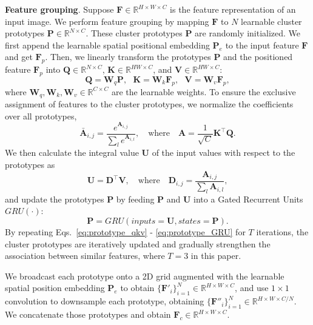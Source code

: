 \noindent\textbf{Feature grouping}. 
Suppose $\mathbf{F}\in \mathbb{R}^{H\times W\times C}$ is the feature representation of an input image. We perform feature grouping by mapping $\mathbf{F}$ to $N$ learnable cluster prototypes $\mathbf{P}\in \mathbb{R}^{N\times C}$. These cluster prototypes $\mathbf{P}$ are randomly initialized. 
We first append the learnable spatial positional embedding $\mathbf{P}_e$ to the input feature $\mathbf{F}$ and get $\mathbf{F}_p$. Then, we linearly transform the prototypes $\mathbf{P}$ and the positioned feature $\mathbf{F}_p$ into $\mathbf{Q}\in\mathbb{R}^{N\times C}$, $\mathbf{K}\in\mathbb{R}^{H W\times C}$, and $\mathbf{V}\in\mathbb{R}^{H W\times C}$:
\begin{equation}\label{eq:prototype_qkv}
    \mathbf{Q} = \mathbf{W}_q \mathbf{P}, \ \ \ \mathbf{K} = \mathbf{W}_k \mathbf{F}_p, \ \ \ \mathbf{V} = \mathbf{W}_v \mathbf{F}_p, 
\end{equation}
where $\mathbf{W}_q, \mathbf{W}_k, \mathbf{W}_v \in \mathbb{R}^{C\times C}$ are the learnable weights. 
To ensure the exclusive assignment of features to the cluster prototypes, 
we normalize the coefficients over all prototypes, 
\begin{equation}
    \bar{\mathbf{A}}_{i,j}=\frac{e^{\mathbf{A}_{i,j}}}{\sum_l e^{\mathbf{A}_{i,l}}}, \quad \mathrm{where} \quad \mathbf{A}=\frac{1}{\sqrt{C}} \mathbf{K}^{\top} \mathbf{Q}.
\end{equation}
We then calculate the integral value $\mathbf{U}$ of the input values with respect to  the prototypes as
\begin{equation}
    \mathbf{U} = \mathbf{D}^{\top} \mathbf{V}, \quad \mathrm{where} \quad \mathbf{D}_{i,j}= \frac{\mathbf{A}_{i,j}}{\sum_l \mathbf{A}_{i,l}}, 
\end{equation}
and update the prototypes $\mathbf{P}$ by feeding $\mathbf{P}$ and $\mathbf{U}$ into a Gated Recurrent Units $GRU(\cdot)$:
\begin{equation}\label{eq:prototype_GRU}
    \mathbf{P} = GRU\left(inputs=\mathbf{U}, states = \mathbf{P}\right).
\end{equation}
By repeating Eqs.~\eqref{eq:prototype_qkv} - \eqref{eq:prototype_GRU} for $T$ iterations, the cluster prototypes are iteratively updated and gradually strengthen the association between similar features, where $T=3$ in this paper.

We broadcast each prototype onto a 2D grid augmented with the learnable spatial position embedding $\mathbf{P}_e$ to obtain $\{\mathbf{F}'_i\}_{i=1}^N \in \mathbb{R}^{H\times W\times C}$, and use $1\times1$ convolution to downsample each prototype, obtaining $\{\mathbf{F}''_i\}_{i=1}^N \in \mathbb{R}^{H\times W\times C/N}$. We concatenate those prototypes and obtain $\mathbf{F}_c\in \mathbb{R}^{H\times W\times C}$. 

